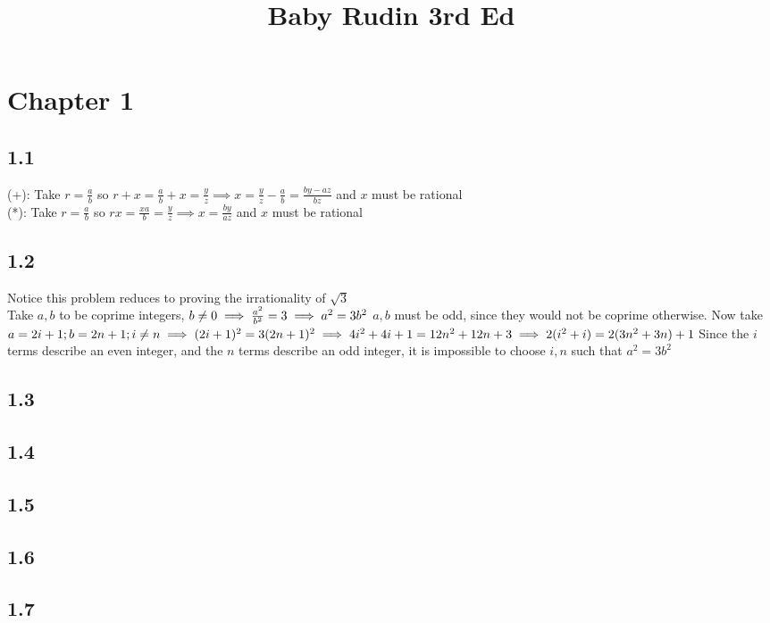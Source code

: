 \documentclass[11pt]{article}
\begin{document}
\title{Baby Rudin 3rd Ed}

\maketitle
\clearpage

\section*{Chapter 1}
	\subsection*{1.1}
		(+): Take $ r = \frac{a}{b}$ so $ r + x = \frac{a}{b} + x = \frac{y}{z} \implies x = \frac{y}{z} - \frac{a}{b} =  \frac{by - az}{bz}$ and $x$ must be rational\\
		(*): Take $r = \frac{a}{b}$ so $rx = \frac{xa}{b} = \frac{y}{z} \implies x = \frac{by}{az}$ and $x$ must be rational
	\subsection*{1.2}
		Notice this problem reduces to proving the irrationality of $\sqrt{3}$\\
		Take $a, b$ to be coprime integers, $b \centernot = 0 \implies \frac{a^2}{b^2}  = 3 \implies a^2 = 3b^2$  $a, b$ must be odd, since they would not be
		coprime otherwise.  Now take $a = 2i + 1; b = 2n + 1; i \centernot = n \implies (2i + 1)^2 = 3(2n + 1)^2 \implies 4i^2 + 4i + 1 = 12n^2 + 12n + 3 
		\implies 2(i^2 + i) = 2(3n^2 + 3n) + 1$  Since the $i$ terms describe an even integer, and the $n$ terms describe an odd integer, it is impossible to choose
		$i, n$ such that $a^2 = 3b^2$
	\subsection*{1.3}
	\subsection*{1.4}
	\subsection*{1.5}
	\subsection*{1.6}
	\subsection*{1.7}
\end{document}
